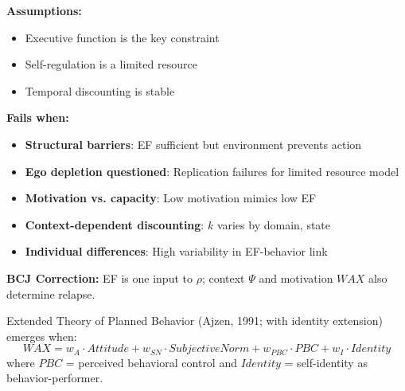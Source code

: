 \begin{tcolorbox}[colback=red!5!white, colframe=red!75!black, title=Boundary Condition: Where TST Fails]
\textbf{Assumptions:}
\begin{itemize}[nosep]
\item Executive function is the key constraint
\item Self-regulation is a limited resource
\item Temporal discounting is stable
\end{itemize}

\textbf{Fails when:}
\begin{itemize}[nosep]
\item \textbf{Structural barriers}: EF sufficient but environment prevents action
\item \textbf{Ego depletion questioned}: Replication failures for limited resource model
\item \textbf{Motivation vs. capacity}: Low motivation mimics low EF
\item \textbf{Context-dependent discounting}: $k$ varies by domain, state
\item \textbf{Individual differences}: High variability in EF-behavior link
\end{itemize}

\textbf{BCJ Correction:} EF is one input to $\rho$; context $\Psi$ and motivation $WAX$ also determine relapse.
\end{tcolorbox}


\begin{theorem}
\label{thm:tpb-extended}
Extended Theory of Planned Behavior (Ajzen, 1991; with identity extension) emerges when:
\begin{equation}
\boxed{WAX = w_A \cdot Attitude + w_{SN} \cdot SubjectiveNorm + w_{PBC} \cdot PBC + w_I \cdot Identity}
\end{equation}
where $PBC$ = perceived behavioral control and $Identity$ = self-identity as behavior-performer.
\end{theorem}

